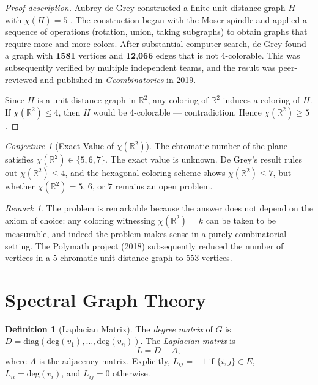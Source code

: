 \documentclass[12pt,a4paper]{amsart}
\theoremstyle{definition}
\newtheorem{definition}[theorem]{Definition}
\theoremstyle{remark}
\newtheorem{remark}[theorem]{Remark}
\newtheorem{conjecture}[theorem]{Conjecture}
\newcommand{\R}{\mathbb{R}}
\newcommand{\chr}{\chi}
\newcommand{\degv}{\mathrm{deg}}
\begin{document}
\begin{proof}[Proof description]
Aubrey de Grey constructed a finite unit-distance graph $H$ with
$\chr(H) = 5$ \cite{degrey2018}. The construction began with the Moser spindle
and applied a sequence of operations (rotation, union, taking subgraphs) to
obtain graphs that require more and more colors. After substantial computer
search, de Grey found a graph with $\mathbf{1581}$ vertices and $\mathbf{12}$,\!$\mathbf{066}$
edges that is not 4-colorable. This was subsequently verified by multiple
independent teams, and the result was peer-reviewed and published in
\emph{Geombinatorics} in 2019.

Since $H$ is a unit-distance graph in $\R^2$, any coloring of $\R^2$ induces
a coloring of $H$. If $\chr(\R^2) \le 4$, then $H$ would be 4-colorable —
contradiction. Hence $\chr(\R^2) \ge 5$.
\end{proof}

\begin{conjecture}[Exact Value of $\chr(\R^2)$]
\label{conj:hn-exact}
The chromatic number of the plane satisfies $\chr(\R^2) \in \{5, 6, 7\}$.
The exact value is unknown. De Grey's result rules out $\chr(\R^2) \le 4$,
and the hexagonal coloring scheme shows $\chr(\R^2) \le 7$, but whether
$\chr(\R^2) = 5$, $6$, or $7$ remains an open problem.
\end{conjecture}

\begin{remark}
The problem is remarkable because the answer does not depend on the axiom of
choice: any coloring witnessing $\chr(\R^2) = k$ can be taken to be measurable,
and indeed the problem makes sense in a purely combinatorial setting.
The Polymath project (2018) subsequently reduced the number of vertices in a
5-chromatic unit-distance graph to 553 vertices.
\end{remark}

\section{Spectral Graph Theory}
\label{sec:spectral}

\begin{definition}[Laplacian Matrix]
The \emph{degree matrix} of $G$ is $D = \mathrm{diag}(\degv(v_1), \ldots, \degv(v_n))$.
The \emph{Laplacian matrix} is
\[
  L = D - A,
\]
where $A$ is the adjacency matrix. Explicitly, $L_{ij} = -1$ if $\{i,j\} \in E$,
$L_{ii} = \degv(v_i)$, and $L_{ij} = 0$ otherwise.
\end{definition}
\end{document}
